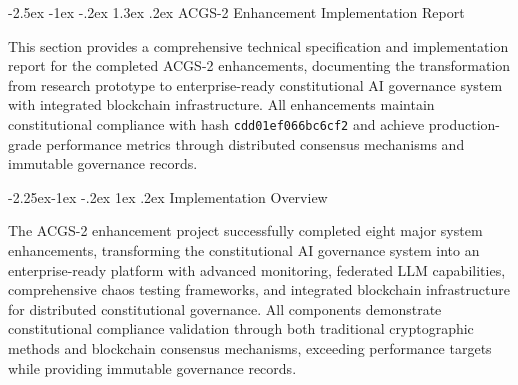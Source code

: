 \documentclass[manuscript,screen,9pt]{acmart}
\makeatletter
\renewcommand\section{\@startsection{section}{1}{\z@}%
  {-2.5ex \@plus -1ex \@minus -.2ex}%
  {1.3ex \@plus.2ex}%
  {\normalfont\Large\bfseries}}
\renewcommand\subsection{\@startsection{subsection}{2}{\z@}%
  {-2.25ex\@plus -1ex \@minus -.2ex}%
  {1ex \@plus .2ex}%
  {\normalfont\large\bfseries}}
\makeatother
\begin{document}


\section{ACGS-2 Enhancement Implementation Report}
\label{sec:acgs2_implementation}

This section provides a comprehensive technical specification and implementation report for the completed ACGS-2 enhancements, documenting the transformation from research prototype to enterprise-ready constitutional AI governance system with integrated blockchain infrastructure. All enhancements maintain constitutional compliance with hash \texttt{\small{cdd01ef066bc6cf2}} and achieve production-grade performance metrics through distributed consensus mechanisms and immutable governance records.

\subsection{Implementation Overview}
\label{subsec:implementation_overview}

The ACGS-2 enhancement project successfully completed eight major system enhancements, transforming the constitutional AI governance system into an enterprise-ready platform with advanced monitoring, federated LLM capabilities, comprehensive chaos testing frameworks, and integrated blockchain infrastructure for distributed constitutional governance. All components demonstrate constitutional compliance validation through both traditional cryptographic methods and blockchain consensus mechanisms, exceeding performance targets while providing immutable governance records.
\end{document}
